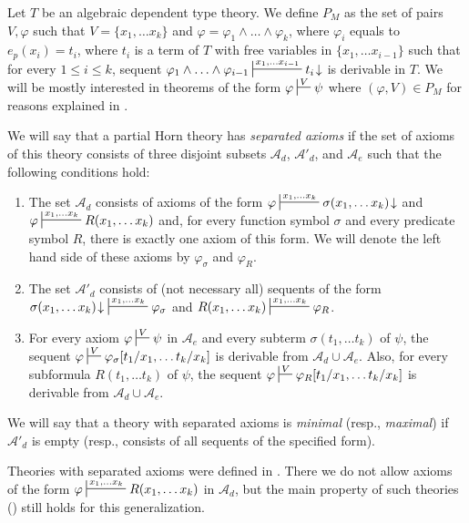 \documentclass[reqno]{amsart}
\theoremstyle{definition}
\theoremstyle{remark}
\numberwithin{figure}{section}
\begin{document}
Let $T$ be an algebraic dependent type theory.
We define $P_M$ as the set of pairs $V,\varphi$ such that $V = \{ x_1, \ldots x_k \}$ and $\varphi = \varphi_1 \land \ldots \land \varphi_k$, where $\varphi_i$ equals to $e_p(x_i) = t_i$,
where $t_i$ is a term of $T$ with free variables in $\{ x_1, \ldots x_{i-1} \}$ such that for every $1 \leq i \leq k$,
sequent $\varphi_1 \land \ldots \land \varphi_{i-1} \sststile{}{x_1, \ldots x_{i-1}} t_i\!\downarrow$ is derivable in $T$.
We will be mostly interested in theorems of the form $\varphi \sststile{}{V} \psi$ where $(\varphi,V) \in P_M$ for reasons explained in \cite{morita-equiv}.

\begin{defn}
We will say that a partial Horn theory has \emph{separated axioms} if the set of axioms of this theory consists of three disjoint subsets $\mathcal{A}_d$, $\mathcal{A}'_d$, and $\mathcal{A}_e$ such that the following conditions hold:
\begin{enumerate}
\item The set $\mathcal{A}_d$ consists of axioms of the form $\varphi \sststile{}{x_1, \ldots x_k} \sigma(x_1, \ldots x_k)\!\downarrow$ and $\varphi \sststile{}{x_1, \ldots x_k} R(x_1, \ldots x_k)$ and, for every function symbol $\sigma$ and every predicate symbol $R$, there is exactly one axiom of this form.
We will denote the left hand side of these axioms by $\varphi_\sigma$ and $\varphi_R$.
\item The set $\mathcal{A}'_d$ consists of (not necessary all) sequents of the form $\sigma(x_1, \ldots x_k)\!\downarrow\ \sststile{}{x_1, \ldots x_k} \varphi_\sigma$ and $R(x_1, \ldots x_k) \sststile{}{x_1, \ldots x_k} \varphi_R$.
\item For every axiom $\varphi \sststile{}{V} \psi$ in $\mathcal{A}_e$ and every subterm $\sigma(t_1, \ldots t_k)$ of $\psi$,
the sequent $\varphi \sststile{}{V} \varphi_\sigma[t_1/x_1, \ldots t_k/x_k]$ is derivable from $\mathcal{A}_d \cup \mathcal{A}_e$.
Also, for every subformula $R(t_1, \ldots t_k)$ of $\psi$, the sequent $\varphi \sststile{}{V} \varphi_R[t_1/x_1, \ldots t_k/x_k]$ is derivable from $\mathcal{A}_d \cup \mathcal{A}_e$.
\end{enumerate}
We will say that a theory with separated axioms is \emph{minimal} (resp., \emph{maximal}) if $\mathcal{A}'_d$ is empty (resp., consists of all sequents of the specified form).
\end{defn}

\begin{remark}
Theories with separated axioms were defined in \cite[Section~5.1]{morita-equiv}.
There we do not allow axioms of the form $\varphi \sststile{}{x_1, \ldots x_k} R(x_1, \ldots x_k)$ in $\mathcal{A}_d$, but the main property of such theories () still holds for this generalization.
\end{remark}
\end{document}
